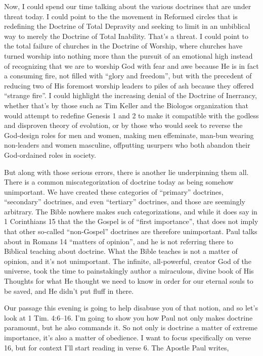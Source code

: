 \documentclass[letterpaper, 12pt]{article}
\begin{document}
    Now, I could spend our time talking about the various doctrines that
    are under threat today. I could point to the the movement in
    Reformed circles that is redefining the Doctrine of Total Depravity
    and seeking to limit in an unbiblical way to merely the Doctrine of
    Total Inability. That's a threat. I could point to the total failure
    of churches in the Doctrine of Worship, where churches have turned
    worship into nothing more than the pursuit of an emotional high
    instead of recognizing that we are to worship God with fear and awe
    because He is in fact a consuming fire, not filled with ``glory and
    freedom'', but with the precedent of reducing two of His foremost
    worship leaders to piles of ash because they offered ``strange
    fire''. I could highlight the increasing denial of the Doctrine of
    Inerrancy, whether that's by those such as Tim Keller and the
    Biologos organization that would attempt to redefine Genesis 1 and 2
    to make it compatible with the godless and disproven theory of
    evolution, or by those who would seek to reverse the God-design
    roles for men and women, making men effeminate, man-bun wearing
    non-leaders and women masculine, offputting usurpers who both
    abandon their God-ordained roles in society.

    But along with those serious errors, there is another lie
    underpinning them all. There is a common miscategorization of
    doctrine today as being somehow unimportant. We have created these
    categories of ``primary'' doctrines, ``secondary'' doctrines, and
    even ``tertiary'' doctrines, and those are seemingly arbitrary. The
    Bible nowhere makes such categorizations, and while it does say in 1
    Corinthians 15 that the the Gospel is of ``first importance'', that
    does not imply that other so-called ``non-Gospel'' doctrines are
    therefore unimportant. Paul talks about in Romans 14 ``matters of
    opinion'', and he is not referring there to Biblical teaching about
    doctrine. What the Bible teaches is not a matter of opinion, and
    it's not unimportant. The infinite, all-powerful, creator God of the
    universe, took the time to painstakingly author a miraculous, divine
    book of His Thoughts for what He thought we need to know in order
    for our eternal souls to be saved, and He didn't put fluff in there.

    Our passage this evening is going to help disabuse you of that
    notion, and so let's look at 1 Tim. 4:6--16. I'm going to show you
    how Paul not only makes doctrine paramount, but he also commands it.
    So not only is doctrine a matter of extreme importance, it's also a
    matter of obedience. I want to focus specifically on verse 16, but
    for context I'll start reading in verse 6. The Apostle Paul writes,
\end{document}
